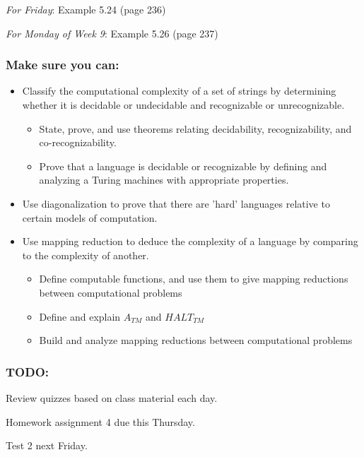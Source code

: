 {\it For Friday}:  Example 5.24 (page 236)

{\it For Monday of Week 9}: Example 5.26 (page 237)

\subsubsection*{Make sure you can:}
\begin{itemize}
\item Classify the computational complexity of a set of strings by determining whether it is decidable or undecidable and recognizable or unrecognizable.
\begin{itemize}
   \item State, prove, and use theorems relating decidability, recognizability, and co-recognizability.
   \item Prove that a language is decidable or recognizable by defining and analyzing a Turing machines with appropriate properties.
\end{itemize}
\item Use diagonalization to prove that there are 'hard' languages relative to certain models of computation.
\item Use mapping reduction to deduce the complexity of a language by comparing to the complexity of another.
   \begin{itemize}
      \item Define computable functions, and use them to give mapping reductions between computational problems
      \item Define and explain $A_{TM}$ and $HALT_{TM}$
      \item Build and analyze mapping reductions between computational problems
   \end{itemize}
\end{itemize}

\begin{comment}
\end{comment}

\subsubsection*{TODO:}
\begin{list}
   {\itemsep2pt}
   \item Review quizzes based on class material each day.
   \item Homework assignment 4 due this Thursday.
   \item Test 2 next Friday.
\end{list}

